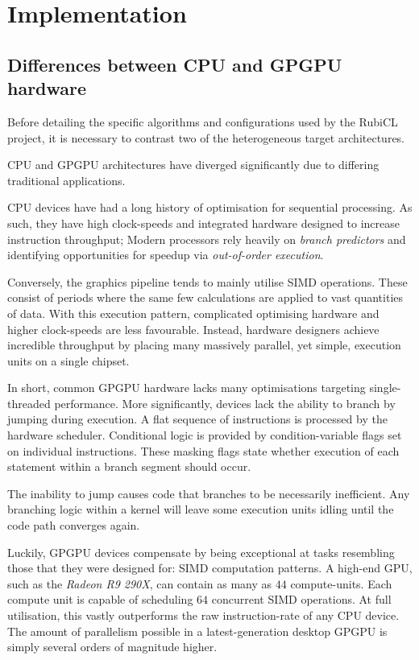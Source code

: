 \chapter{Implementation}
\section{Differences between \ac{CPU} and \ac{GPGPU} hardware}
Before detailing the specific algorithms and configurations used by the RubiCL project, it is necessary to contrast two of the heterogeneous target architectures.

\ac{CPU} and \ac{GPGPU} architectures have diverged significantly due to differing traditional applications.

\ac{CPU} devices have had a long history of optimisation for sequential processing. As such, they have high clock-speeds and integrated hardware designed to increase instruction throughput; Modern processors rely heavily on \emph{branch predictors} and identifying opportunities for speedup via \emph{out-of-order execution}.

Conversely, the graphics pipeline tends to mainly utilise \ac{SIMD} operations. These consist of periods where the same few calculations are applied to vast quantities of data. With this execution pattern, complicated optimising hardware and higher clock-speeds are less favourable. Instead, hardware designers achieve incredible throughput by placing many massively parallel, yet simple, execution units on a single chipset.

In short, common \ac{GPGPU} hardware lacks many optimisations targeting single-threaded performance. More significantly, devices lack the ability to branch by jumping during execution. A flat sequence of instructions is processed by the hardware scheduler. Conditional logic is provided by condition-variable flags set on individual instructions. These masking flags state whether execution of each statement within a branch segment should occur.

The inability to jump causes code that branches to be necessarily inefficient. Any branching logic within a kernel will leave some execution units idling until the code path converges again.

Luckily, \ac{GPGPU} devices compensate by being exceptional at tasks resembling those that they were designed for: \ac{SIMD} computation patterns. A high-end \ac{GPU}, such as the \emph{Radeon R9 290X}, can contain as many as $44$ compute-units. Each compute unit is capable of scheduling $64$ concurrent \ac{SIMD} operations. At full utilisation, this vastly outperforms the raw instruction-rate of any \ac{CPU} device. The amount of parallelism possible in a latest-generation desktop \ac{GPGPU} is simply several orders of magnitude higher.

